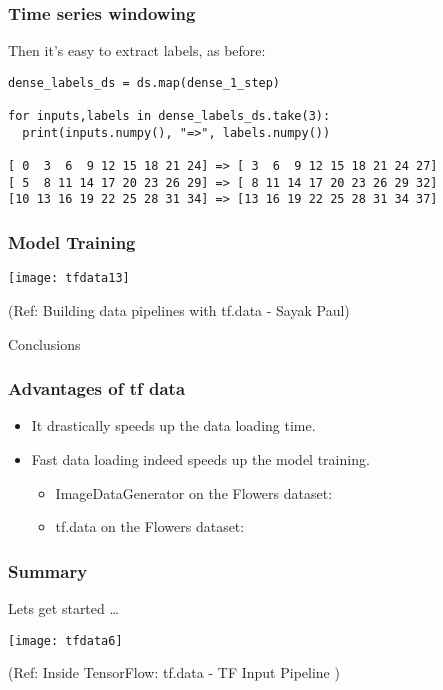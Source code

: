 \begin{frame}[fragile]\frametitle{Time series windowing}

Then it's easy to extract labels, as before:


\begin{lstlisting}
dense_labels_ds = ds.map(dense_1_step)

for inputs,labels in dense_labels_ds.take(3):
  print(inputs.numpy(), "=>", labels.numpy())
	
[ 0  3  6  9 12 15 18 21 24] => [ 3  6  9 12 15 18 21 24 27]
[ 5  8 11 14 17 20 23 26 29] => [ 8 11 14 17 20 23 26 29 32]
[10 13 16 19 22 25 28 31 34] => [13 16 19 22 25 28 31 34 37]
\end{lstlisting}
\end{frame}

\begin{frame}[fragile]\frametitle{Model Training}

\begin{center}
\texttt{[image: tfdata13]}

{\tiny (Ref: Building data pipelines with tf.data - Sayak Paul)}

\end{center}
\end{frame}

\begin{frame}
  \begin{center}
    {\Large Conclusions}
	
  \end{center}
\end{frame}

\begin{frame}[fragile]\frametitle{Advantages of tf data}
\begin{itemize}
\item It drastically speeds up the data loading time.
\item Fast data loading indeed speeds up the model training. 
\begin{itemize}
\item ImageDataGenerator on the Flowers dataset:
\item tf.data on the Flowers dataset:
\end{itemize}
\end{itemize}
\end{frame}

\begin{frame}[fragile]\frametitle{Summary}
Lets get started \ldots

\begin{center}
\texttt{[image: tfdata6]}

{\tiny (Ref: Inside TensorFlow: tf.data - TF Input Pipeline )}

\end{center}
\end{frame}